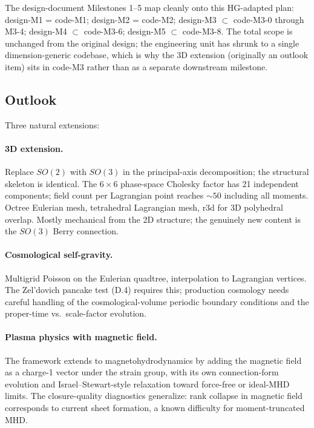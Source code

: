 \documentclass[11pt]{article}
\begin{document}
The design-document Milestones 1--5 map cleanly onto this
HG-adapted plan: design-M1 = code-M1; design-M2 = code-M2; design-M3
$\subset$ code-M3-0 through M3-4; design-M4 $\subset$ code-M3-6;
design-M5 $\subset$ code-M3-8. The total scope is unchanged from the
original design; the engineering unit has shrunk to a single
dimension-generic codebase, which is why the 3D extension
(originally an outlook item) sits in code-M3 rather than as a
separate downstream milestone.

\subsection{Outlook}

Three natural extensions:

\paragraph{3D extension.} Replace $SO(2)$ with $SO(3)$ in the
principal-axis decomposition; the structural skeleton is identical.
The $6\times 6$ phase-space Cholesky factor has 21 independent
components; field count per Lagrangian point reaches $\sim 50$
including all moments. Octree Eulerian mesh, tetrahedral Lagrangian
mesh, r3d for 3D polyhedral overlap. Mostly mechanical from the 2D
structure; the genuinely new content is the $SO(3)$ Berry connection.

\paragraph{Cosmological self-gravity.} Multigrid Poisson on the
Eulerian quadtree, interpolation to Lagrangian vertices. The
Zel'dovich pancake test (D.4) requires this; production cosmology
needs careful handling of the cosmological-volume periodic boundary
conditions and the proper-time vs.\ scale-factor evolution.

\paragraph{Plasma physics with magnetic field.} The framework
extends to magnetohydrodynamics by adding the magnetic field as a
charge-1 vector under the strain group, with its own connection-form
evolution and Israel--Stewart-style relaxation toward force-free or
ideal-MHD limits. The closure-quality diagnostics generalize: rank
collapse in magnetic field corresponds to current sheet formation, a
known difficulty for moment-truncated MHD.
\end{document}
